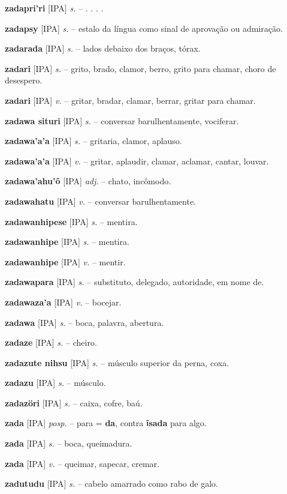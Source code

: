 \textbf{zadapri'ri} [IPA] \textit{s.} -- . . . .

\textbf{zadapsy} [IPA] \textit{s.} -- estalo da língua como sinal de aprovação ou admiração.

\textbf{zadarada} [IPA] \textit{s.} -- lados debaixo dos braços, tórax.

\textbf{zadari} [IPA] \textit{s.} -- grito, brado, clamor, berro, grito para chamar, choro de desespero.

\textbf{zadari} [IPA] \textit{v.} -- gritar, bradar, clamar, berrar, gritar para chamar.

\textbf{zadawa situri} [IPA] \textit{s.} -- conversar barulhentamente, vociferar.

\textbf{zadawa'a'a} [IPA] \textit{s.} -- gritaria, clamor, aplauso.

\textbf{zadawa'a'a} [IPA] \textit{v.} -- gritar, aplaudir, clamar, aclamar, cantar, louvar.

\textbf{zadawa'ahu'õ} [IPA] \textit{adj.} -- chato, incômodo.

\textbf{zadawahatu} [IPA] \textit{v.} -- conversar barulhentamente.

\textbf{zadawanhipese} [IPA] \textit{s.} -- mentira.

\textbf{zadawanhipe} [IPA] \textit{s.} -- mentira.

\textbf{zadawanhipe} [IPA] \textit{v.} -- mentir.

\textbf{zadawapara} [IPA] \textit{s.} -- substituto, delegado, autoridade, em nome de.

\textbf{zadawaza'a} [IPA] \textit{v.} -- bocejar.

\textbf{zadawa} [IPA] \textit{s.} -- boca, palavra, abertura.

\textbf{zadaze} [IPA] \textit{s.} -- cheiro.

\textbf{zadazute nihsu} [IPA] \textit{s.} -- músculo superior da perna, coxa.

\textbf{zadazu} [IPA] \textit{s.} -- músculo.

\textbf{zadazöri} [IPA] \textit{s.} -- caixa, cofre, baú.

\textbf{zada} [IPA] \textit{posp.} -- para = \textbf{da}, contra  \textbf{ĩsada} para algo.

\textbf{zada} [IPA] \textit{s.} -- boca, queimadura.

\textbf{zada} [IPA] \textit{v.} -- queimar, sapecar, cremar.

\textbf{zadutudu} [IPA] \textit{s.} -- cabelo amarrado como rabo de galo.

